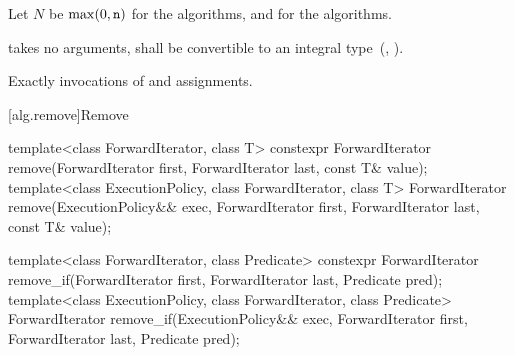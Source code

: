 \begin{itemdescr}
{\color{newclr}
\pnum
Let $N$ be $\max(0, \texttt{n})$ for the  algorithms, and
 for the  algorithms.
} %

\pnum
\requires
{} takes no arguments,
shall be convertible to an integral type~(, ).

\pnum
\effects
{}


\pnum
\returns
{}


\pnum
\complexity
Exactly 
invocations of  and assignments.
\end{itemdescr}


[alg.remove]{Remove}

%
%
\begin{itemdecl}
template<class ForwardIterator, class T>
  constexpr ForwardIterator remove(ForwardIterator first, ForwardIterator last,
                                   const T& value);
template<class ExecutionPolicy, class ForwardIterator, class T>
  ForwardIterator remove(ExecutionPolicy&& exec,
                         ForwardIterator first, ForwardIterator last,
                         const T& value);

template<class ForwardIterator, class Predicate>
  constexpr ForwardIterator remove_if(ForwardIterator first, ForwardIterator last,
                                      Predicate pred);
template<class ExecutionPolicy, class ForwardIterator, class Predicate>
  ForwardIterator remove_if(ExecutionPolicy&& exec,
                            ForwardIterator first, ForwardIterator last,
                            Predicate pred);
\end{itemdecl}

